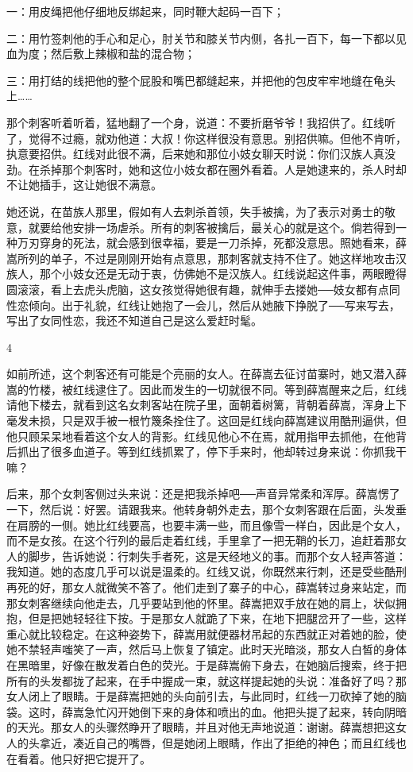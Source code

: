 一：用皮绳把他仔细地反绑起来，同时鞭大起码一百下； 

二：用竹签刺他的手心和足心，肘关节和膝关节内侧，各扎一百下，每一下都以见血为度；然后敷上辣椒和盐的混合物； 

三：用打结的线把他的整个屁股和嘴巴都缝起来，并把他的包皮牢牢地缝在龟头上…… 

那个刺客听着听着，猛地翻了一个身，说道：不要折磨爷爷！我招供了。红线听了，觉得不过瘾，就劝他道：大叔！你这样很没有意思。别招供嘛。但他不肯听，执意要招供。红线对此很不满，后来她和那位小妓女聊天时说：你们汉族人真没劲。在杀掉那个刺客时，她和这位小妓女都在圈外看着。人是她逮来的，杀人时却不让她插手，这让她很不满意。 

她还说，在苗族人那里，假如有人去刺杀首领，失手被擒，为了表示对勇士的敬意，就要给他安排一场虐杀。所有的刺客被擒后，最关心的就是这个。倘若得到一种万刃穿身的死法，就会感到很幸福，要是一刀杀掉，死都没意思。照她看来，薛嵩所列的单子，不过是刚刚开始有点意思，那刺客就支持不住了。她这样地攻击汉族人，那个小妓女还是无动于衷，仿佛她不是汉族人。红线说起这件事，两眼瞪得圆滚滚，看上去虎头虎脑，这女孩觉得她很有趣，就伸手去搂她──妓女都有点同性恋倾向。出于礼貌，红线让她抱了一会儿，然后从她腋下挣脱了──写来写去，写出了女同性恋，我还不知道自己是这么爱赶时髦。 

4 

如前所述，这个刺客还有可能是个亮丽的女人。在薛嵩去征讨苗寨时，她又潜入薛嵩的竹楼，被红线逮住了。因此而发生的一切就很不同。等到薛嵩醒来之后，红线请他下楼去，就看到这名女刺客站在院子里，面朝着树篱，背朝着薛嵩，浑身上下毫发未损，只是双手被一根竹篾条拴住了。这回是红线向薛嵩建议用酷刑逼供，但他只顾呆呆地看着这个女人的背影。红线见他心不在焉，就用指甲去抓他，在他背后抓出了很多血道子。等到红线抓累了，停下手来时，他却转过身来说：你抓我干嘛？ 

后来，那个女刺客侧过头来说：还是把我杀掉吧──声音异常柔和浑厚。薛嵩愣了一下，然后说：好罢。请跟我来。他转身朝外走去，那个女刺客跟在后面，头发垂在肩膀的一侧。她比红线要高，也要丰满一些，而且像雪一样白，因此是个女人，而不是女孩。在这个行列的最后走着红线，手里拿了一把无鞘的长刀，追赶着那女人的脚步，告诉她说：行刺失手者死，这是天经地义的事。而那个女人轻声答道：我知道。她的态度几乎可以说是温柔的。红线又说，你既然来行刺，还是受些酷刑再死的好，那女人就微笑不答了。他们走到了寨子的中心，薛嵩转过身来站定，而那女刺客继续向他走去，几乎要站到他的怀里。薛嵩把双手放在她的肩上，状似拥抱，但是把她轻轻往下按。于是那女人就跪了下来，在地下把腿岔开了一些，这样重心就比较稳定。在这种姿势下，薛嵩用就便器材吊起的东西就正对着她的脸，使她不禁轻声嗤笑了一声，然后马上恢复了镇定。此时天光暗淡，那女人白皙的身体在黑暗里，好像在散发着白色的荧光。于是薛嵩俯下身去，在她脑后搜索，终于把所有的头发都拢了起来，在手中握成一束，就这样提起她的头说：准备好了吗？那女人闭上了眼睛。于是薛嵩把她的头向前引去，与此同时，红线一刀砍掉了她的脑袋。这时，薛嵩急忙闪开她倒下来的身体和喷出的血。他把头提了起来，转向阴暗的天光。那女人的头骤然睁开了眼睛，并且对他无声地说道：谢谢。薛嵩想把这女人的头拿近，凑近自己的嘴唇，但是她闭上眼睛，作出了拒绝的神色；而且红线也在看着。他只好把它提开了。 

